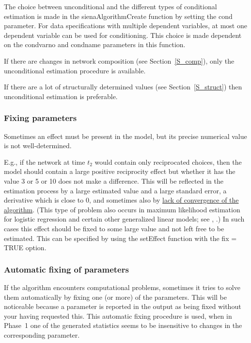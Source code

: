 \documentclass[a4paper,fleqn,11pt]{article}
\newcommand{\+}{\, + \,}
\begin{document}
The choice between
unconditional and the different types of conditional estimation is
made in the \textsf{sienaAlgorithmCreate} function by setting the
\textsf{cond} parameter.
For data specifications with multiple dependent variables,
at most one dependent variable can be used for conditioning.
This choice is made dependent on the
\textsf{condvarno} and \textsf{condname} parameters in this function.

If there are changes in network composition (see
Section~\ref{S_comp}), only the unconditional estimation procedure
is available.

If there are a lot of structurally determined values (see Section~\ref{S_struct})
then unconditional estimation is preferable.


\subsubsection{Fixing parameters}
\label{S_fixingparameters}

\hypertarget{T_fix}{Sometimes an effect must be present in the
model, but its precise numerical value is not well-determined.}
E.g., if the network at time $t_2$ would contain only reciprocated
choices, then the model should contain a large positive
reciprocity effect but whether it has the value 3 or 5 or 10 does
not make a difference. This will be reflected in the estimation
process by a large estimated value and a large standard error, a
derivative which is close to 0, and sometimes also by
\hyperlink{T_convergence}{lack of convergence of the algorithm}.
(This type of problem also occurs in maximum likelihood estimation
for logistic regression and certain other generalized linear
models; \label{LargeFix} see \citet[section 1.6]{GeyerThompson92},
\citet{AlbertAnderson84, HauckDonner77}.)
In such cases this effect
should be fixed to some large value and not left free to be
estimated. This can be specified
by using the \textsf{setEffect} function with the
\textsf{fix = TRUE} option.



\subsubsection{Automatic fixing of parameters}
\label{S_fixing}

If the algorithm encounters computational
problems, sometimes it tries to solve them automatically by fixing
one (or more) of the parameters. This will be noticeable because a
parameter is reported in the output as being fixed without your
having requested this. This automatic fixing procedure is used,
when in Phase~1 one of the generated statistics seems to be
insensitive to changes in the corresponding parameter.
\end{document}
